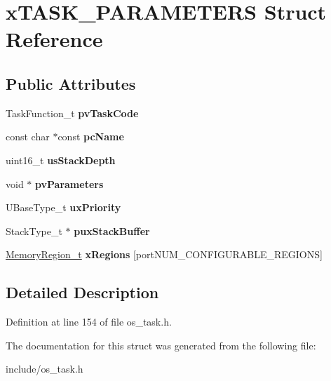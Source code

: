 \hypertarget{structxTASK__PARAMETERS}{}\section{x\+T\+A\+S\+K\+\_\+\+P\+A\+R\+A\+M\+E\+T\+E\+RS Struct Reference}
\label{structxTASK__PARAMETERS}
\subsection*{Public Attributes}
\begin{DoxyCompactItemize}
\item 
\mbox{\label{structxTASK__PARAMETERS_a7527993402054565cda38251c8922880}} 
Task\+Function\+\_\+t {\bfseries pv\+Task\+Code}
\item 
\mbox{\label{structxTASK__PARAMETERS_a7b3e5583acf9de8bacac572a42246459}} 
const char $\ast$const {\bfseries pc\+Name}
\item 
\mbox{\label{structxTASK__PARAMETERS_aa07bfb2214d78ba7a30592fa7b75af18}} 
uint16\+\_\+t {\bfseries us\+Stack\+Depth}
\item 
\mbox{\label{structxTASK__PARAMETERS_accbb9f4de75b5b5be750198b52390c7f}} 
void $\ast$ {\bfseries pv\+Parameters}
\item 
\mbox{\label{structxTASK__PARAMETERS_aa1aff14035db645e2bdcc85b3cdc9bab}} 
U\+Base\+Type\+\_\+t {\bfseries ux\+Priority}
\item 
\mbox{\label{structxTASK__PARAMETERS_a946c525d3765369780538f9bc3f3586d}} 
Stack\+Type\+\_\+t $\ast$ {\bfseries pux\+Stack\+Buffer}
\item 
\mbox{\label{structxTASK__PARAMETERS_ae8b97c6b7a344bf09b066b0844844d66}} 
\mbox{\hyperlink{structxMEMORY__REGION}{Memory\+Region\+\_\+t}} {\bfseries x\+Regions} \mbox{[}port\+N\+U\+M\+\_\+\+C\+O\+N\+F\+I\+G\+U\+R\+A\+B\+L\+E\+\_\+\+R\+E\+G\+I\+O\+NS\mbox{]}
\end{DoxyCompactItemize}


\subsection{Detailed Description}


Definition at line 154 of file os\+\_\+task.\+h.



The documentation for this struct was generated from the following file\+:\begin{DoxyCompactItemize}
\item 
include/os\+\_\+task.\+h\end{DoxyCompactItemize}
